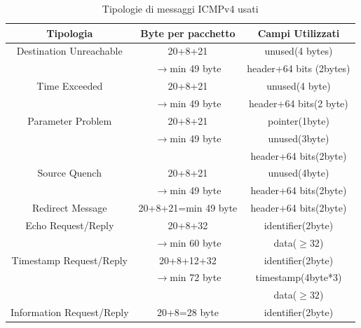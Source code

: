 \begin{longtable}{|c|c|c|}
\caption{Tipologie di messaggi ICMPv4 usati} 
\label{table:icmpv4:tipologie} \\
    \hline 
    \textbf{Tipologia} & \textbf{Byte per pacchetto} & \textbf{Campi Utilizzati}  \\ %
    \hline
    Destination Unreachable  & 20+8+21 & unused(4 bytes) \\ 
    &$\rightarrow$min 49 byte& header+64 bits (2bytes)\\ %
    \hline 
    Time Exceeded  & 20+8+21 & unused(4 byte)\\ 
    &$\rightarrow$min 49 byte&header+64 bits(2 byte) \\ %
    \hline
    Parameter Problem  & 20+8+21 & pointer(1byte)\\ 
    &$\rightarrow$min 49 byte&unused(3byte)\\ 
    &&header+64 bits(2byte)  \\ %
    \hline 
    Source Quench   & 20+8+21 & unused(4byte)\\ 
    &$\rightarrow$min 49 byte&header+64 bits(2byte) \\ %
    \hline     
    Redirect Message & 20+8+21=min 49 byte & header+64 bits(2byte) \\ %
    \hline 
    Echo Request/Reply & 20+8+32 & identifier(2byte)\\ 
    &$\rightarrow$min 60 byte&data($\geq32$) \\ %
    \hline 
    Timestamp Request/Reply & 20+8+12+32& identifier(2byte)\\ 
    &$\rightarrow$min 72 byte&timestamp(4byte*3)\\ 
    &&data($\geq32$) \\ %
    \hline 
    Information Request/Reply & 20+8=28 byte & identifier(2byte) \\ %
    \hline 
\end{longtable} 
\vspace{2ex}
